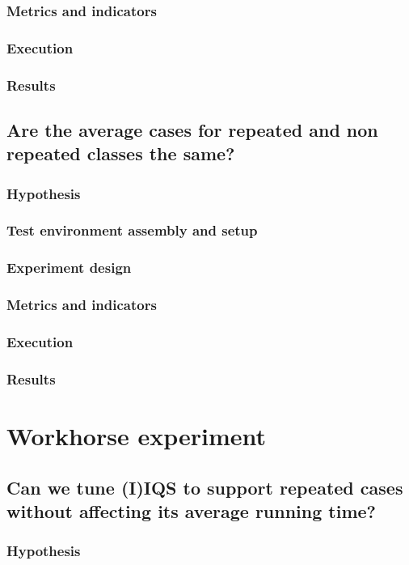 \documentclass{iccmemoria}
\begin{document}
\subsubsection{Metrics and indicators}
\subsubsection{Execution}
\subsubsection{Results}

\subsection{Are the average cases for repeated and non repeated classes the same?} %
\subsubsection{Hypothesis}
\subsubsection{Test environment assembly and setup}
\subsubsection{Experiment design}
\subsubsection{Metrics and indicators}
\subsubsection{Execution}
\subsubsection{Results}

\section{Workhorse experiment}

\subsection{Can we tune (I)IQS to support repeated cases without affecting its average running time?}
\subsubsection{Hypothesis}
\end{document}

